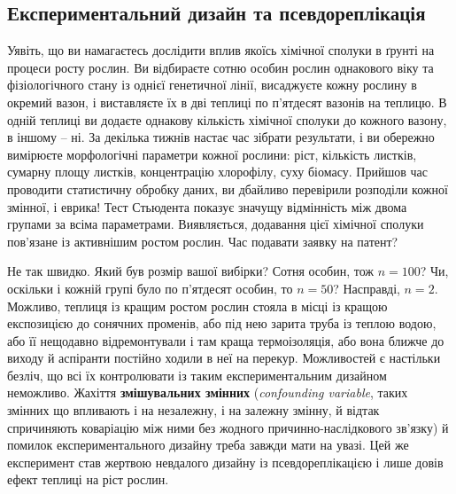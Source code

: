 \documentclass[
  11pt,
]{book}
\begin{document}
\subsection{Експериментальний дизайн та псевдореплікація}\label{pseudoreplication}

Уявіть, що ви намагаєтесь дослідити вплив якоїсь хімічної сполуки в ґрунті на процеси росту рослин. Ви відбираєте сотню особин рослин однакового віку та фізіологічного стану із однієї генетичної лінії, висаджуєте кожну рослину в окремий вазон, і виставляєте їх в дві теплиці по п'ятдесят вазонів на теплицю. В одній теплиці ви додаєте однакову кількість хімічної сполуки до кожного вазону, в іншому -- ні. За декілька тижнів настає час зібрати результати, і ви обережно вимірюєте морфологічні параметри кожної рослини: ріст, кількість листків, сумарну площу листків, концентрацію хлорофілу, суху біомасу. Прийшов час проводити статистичну обробку даних, ви дбайливо перевірили розподіли кожної змінної, і еврика! Тест Стьюдента показує значущу відмінність між двома групами за всіма параметрами. Виявляється, додавання цієї хімічної сполуки пов'язане із активнішим ростом рослин. Час подавати заявку на патент?

Не так швидко. Який був розмір вашої вибірки? Сотня особин, тож \(n = 100\)? Чи, оскільки і кожній групі було по п'ятдесят особин, то \(n = 50\)? Насправді, \(n = 2\). Можливо, теплиця із кращим ростом рослин стояла в місці із кращою експозицією до сонячних променів, або під нею зарита труба із теплою водою, або її нещодавно відремонтували і там краща термоізоляція, або вона ближче до виходу й аспіранти постійно ходили в неї на перекур. Можливостей є настільки безліч, що всі їх контролювати із таким експериментальним дизайном неможливо. Жахіття \textbf{змішувальних змінних} (\emph{confounding variable}, таких змінних що впливають і на незалежну, і на залежну змінну, й відтак спричиняють коваріацію між ними без жодного причинно-наслідкового зв'язку) й помилок експериментального дизайну треба завжди мати на увазі. Цей же експеримент став жертвою невдалого дизайну із псевдореплікацією і лише довів ефект теплиці на ріст рослин.
\end{document}
